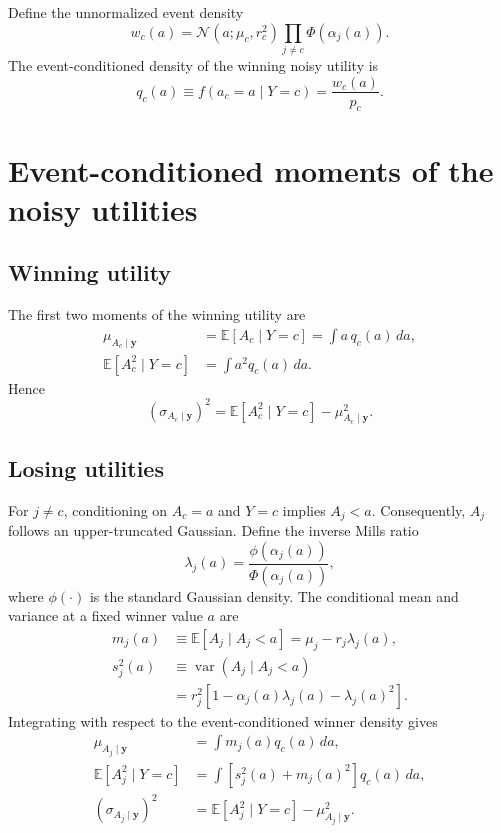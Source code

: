 \documentclass[11pt]{article}
\newcommand{\E}{\mathbb{E}}
\newcommand{\Var}{\operatorname{var}}
\newcommand{\Normal}{\mathcal{N}}
\begin{document}
Define the unnormalized event density
\begin{equation}
 w_c(a)
 =
 \Normal(a;\mu_c,r_c^2)
 \prod_{j\ne c}\Phi\!\left(\alpha_j(a)\right).
\end{equation}
The event-conditioned density of the winning noisy utility is
\begin{equation}
 q_c(a)
 \equiv f(a_c=a\mid Y=c)
 =\frac{w_c(a)}{p_c}.
 \label{eq:winner-density}
\end{equation}

\section{Event-conditioned moments of the noisy utilities}

\subsection{Winning utility}

The first two moments of the winning utility are
\begin{align}
 \mu_{A_c\mid\bm y}
 &=
 \E[A_c\mid Y=c]
 =
 \int a\,q_c(a)\,da,
 \label{eq:winner-mean}
 \\
 \E[A_c^2\mid Y=c]
 &=
 \int a^2 q_c(a)\,da.
 \label{eq:winner-second}
\end{align}
Hence
\begin{equation}
 (\sigma_{A_c\mid\bm y})^2
 =
 \E[A_c^2\mid Y=c]
 -\mu_{A_c\mid\bm y}^2.
 \label{eq:winner-variance}
\end{equation}

\subsection{Losing utilities}

For $j\ne c$, conditioning on $A_c=a$ and $Y=c$ implies $A_j<a$.
Consequently, $A_j$ follows an upper-truncated Gaussian.  Define the inverse
Mills ratio
\begin{equation}
 \lambda_j(a)
 =
 \frac{\phi(\alpha_j(a))}{\Phi(\alpha_j(a))},
 \label{eq:mills-ratio}
\end{equation}
where $\phi(\cdot)$ is the standard Gaussian density.  The conditional mean
and variance at a fixed winner value $a$ are
\begin{align}
 m_j(a)
 &\equiv
 \E[A_j\mid A_j<a]
 =
 \mu_j-r_j\lambda_j(a),
 \label{eq:loser-local-mean}
 \\
 s_j^2(a)
 &\equiv
 \Var(A_j\mid A_j<a)
 \\
 &=
 r_j^2\left[
 1-\alpha_j(a)\lambda_j(a)-\lambda_j(a)^2
 \right].
 \label{eq:loser-local-variance}
\end{align}
Integrating with respect to the event-conditioned winner density gives
\begin{align}
 \mu_{A_j\mid\bm y}
 &=
 \int m_j(a)q_c(a)\,da,
 \label{eq:loser-mean}
 \\
 \E[A_j^2\mid Y=c]
 &=
 \int\left[s_j^2(a)+m_j(a)^2\right]q_c(a)\,da,
 \label{eq:loser-second}
 \\
 (\sigma_{A_j\mid\bm y})^2
 &=
 \E[A_j^2\mid Y=c]-\mu_{A_j\mid\bm y}^2.
 \label{eq:loser-variance}
\end{align}
\end{document}
